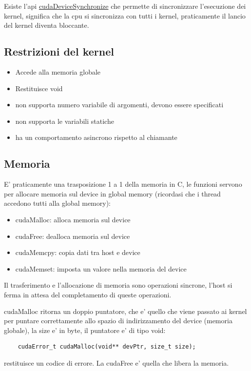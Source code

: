 Esiste l'api \underline{cudaDeviceSynchronize} che permette di sincronizzare l'esecuzione dei kernel, significa che la cpu si sincronizza con tutti i kernel, praticamente il lancio del kernel diventa bloccante.

\subsection{Restrizioni del kernel}
\begin{itemize}
    \item Accede alla memoria globale
    \item Restituisce void
    \item non supporta numero variabile di argomenti, devono essere specificati
    \item non supporta le variabili statiche
    \item ha un comportamento asincrono rispetto al chiamante
\end{itemize}

\subsection{Memoria}
E' praticamente una trasposizione 1 a 1 della memoria in C, le funzioni servono per allocare memoria sul device in global memory (ricordasi che i thread accedono tutti alla global memory):
\begin{itemize}
    \item cudaMalloc: alloca memoria sul device
    \item cudaFree: dealloca memoria sul device
    \item cudaMemcpy: copia dati tra host e device
    \item cudaMemset: imposta un valore nella memoria del device
\end{itemize}
Il trasferimento e l'allocazione di memoria sono operazioni sincrone, l'host si ferma in attesa del completamento di queste operazioni.

cudaMalloc ritorna un doppio puntatore, che e' quello che viene passato ai kernel per puntare correttamente allo spazio di indirizzamento del device (memoria globale), la size e' in byte, il puntatore e' di tipo void\*:
\begin{lstlisting}
    cudaError_t cudaMalloc(void** devPtr, size_t size);
\end{lstlisting}

restituisce un codice di errore. La cudaFree e' quella che libera la memoria.

